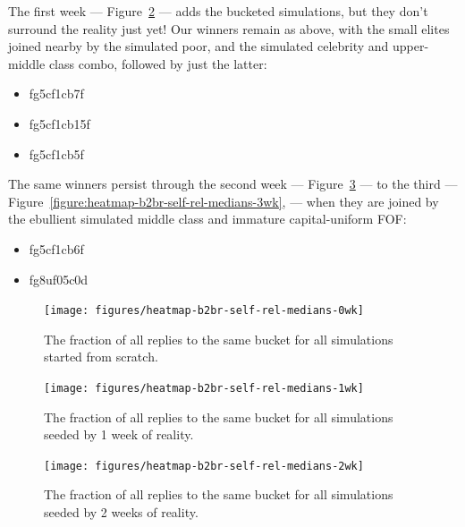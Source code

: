 \documentclass[10pt,oneside]{memoir}
\begin{document}
The first week --- Figure~\ref{figure:heatmap-b2br-self-rel-medians-1wk} ---  adds the bucketed simulations, but they don't surround the reality just yet!  Our winners remain as above, with the small elites joined nearby by the simulated poor, and the simulated celebrity and upper-middle class combo, followed by just the latter:


\begin{itemize}


\item fg5cf1cb7f

\item fg5cf1cb15f

\item fg5cf1cb5f
\end{itemize}

The same winners persist through the second week --- Figure~\ref{figure:heatmap-b2br-self-rel-medians-2wk} ---  to the third --- Figure~\ref{figure:heatmap-b2br-self-rel-medians-3wk}, ---  when they are joined by the ebullient simulated middle class and immature capital-uniform FOF:


\begin{itemize}


\item fg5cf1cb6f

\item fg8uf05c0d
\end{itemize}


\begin{figure}
\begin{center}
    \texttt{[image: figures/heatmap-b2br-self-rel-medians-0wk]}
    \caption{The fraction of all replies to the same bucket for all simulations started from scratch.}
    \label{figure:heatmap-b2br-self-rel-medians-0wk}
\end{center}
\end{figure}

\begin{figure}
\begin{center}
    \texttt{[image: figures/heatmap-b2br-self-rel-medians-1wk]}
    \caption{The fraction of all replies to the same bucket for all simulations seeded by 1 week of reality.}
    \label{figure:heatmap-b2br-self-rel-medians-1wk}
\end{center}
\end{figure}

\begin{figure}
\begin{center}
    \texttt{[image: figures/heatmap-b2br-self-rel-medians-2wk]}
    \caption{The fraction of all replies to the same bucket for all simulations seeded by 2 weeks of reality.}
    \label{figure:heatmap-b2br-self-rel-medians-2wk}
\end{center}
\end{figure}
\end{document}
